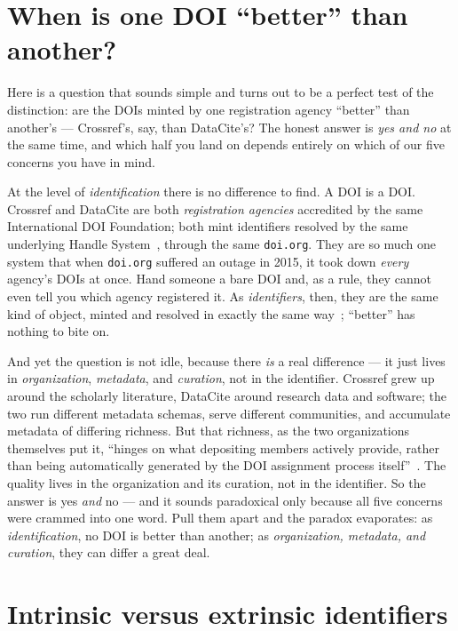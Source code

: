 \section{When is one DOI ``better'' than another?}

Here is a question that sounds simple and turns out to be a perfect test of the distinction: are
the DOIs minted by one registration agency \enquote{better} than another's --- Crossref's, say,
than DataCite's? The honest answer is \emph{yes and no} at the same time, and which half you land
on depends entirely on which of our five concerns you have in mind.

At the level of \emph{identification} there is no difference to find. A DOI is a DOI. Crossref and
DataCite are both \emph{registration agencies} accredited by the same International DOI Foundation;
both mint identifiers resolved by the same underlying Handle System~\autocite{Arms01,RFC3650},
through the same \texttt{doi.org}. They are so much one system that when \texttt{doi.org} suffered
an outage in 2015, it took down \emph{every} agency's DOIs at once. Hand someone a bare DOI and, as
a rule, they cannot even tell you which agency registered it. As \emph{identifiers}, then, they are
the same kind of object, minted and resolved in exactly the same way~\autocite{doifoundation_ra};
\enquote{better} has nothing to bite on.

And yet the question is not idle, because there \emph{is} a real difference --- it just lives in
\emph{organization}, \emph{metadata}, and \emph{curation}, not in the identifier. Crossref grew up around the
scholarly literature, DataCite around research data and software; the two run different metadata
schemas, serve different communities, and accumulate metadata of differing richness. But that
richness, as the two organizations themselves put it, \enquote{hinges on what depositing members
actively provide, rather than being automatically generated by the DOI assignment process
itself}~\autocite{crossrefdatacite_metadata}. The quality lives in the organization and its
curation, not in the identifier. So the answer is yes \emph{and} no --- and it sounds paradoxical
only because all five concerns were crammed into one word. Pull them apart and the paradox
evaporates: as \emph{identification}, no DOI is better than another; as \emph{organization, metadata,
and curation}, they can differ a great deal.

\section{Intrinsic versus extrinsic identifiers}

